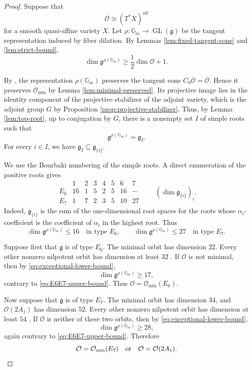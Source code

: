 \documentclass[10pt,a4paper]{amsart}
\newcommand{\Gm}{\mathbb G_m}
\newcommand{\aff}{\mathrm{aff}}
\begin{document}
\begin{proof}
Suppose that
\[
\overline{\mathcal O}\cong(T^*X)^{\aff}
\]
for a smooth quasi-affine variety $X$. Let
$\rho:\Gm\to\operatorname{GL}(\mathfrak g)$ be the tangent
representation induced by fiber dilation. By Lemmas
\ref{lem:fixed-tangent-cone} and \ref{lem:strict-bound},
\begin{equation}\label{eq:exceptional-lower-bound}
\dim\mathfrak g^{\rho(\Gm)}
\geq\frac12\dim\mathcal O+1.
\end{equation}

By \cite[Lemma 5.2]{Jia}, the representation $\rho(\Gm)$ preserves the
tangent cone $C_0\overline{\mathcal O}=\overline{\mathcal O}$. Hence it
preserves $\overline{\mathcal O}_{\min}$ by Lemma
\ref{lem:minimal-preserved}. Its projective image lies in the identity
component of the projective stabilizer of the adjoint variety, which
is the adjoint group $G$ by Proposition
\ref{prop:projective-stabilizer}.
Thus, by Lemma \ref{lem:top-root}, up to conjugation by $G$, there
is a nonempty set $I$ of simple roots such that
\[
\mathfrak g^{\rho(\Gm)}=\mathfrak g_I.
\]
For every $i\in I$, we have
$\mathfrak g_I\subseteq\mathfrak g_{\{i\}}$.

We use the Bourbaki numbering of the simple roots. A direct enumeration
of the positive roots gives
\[
\begin{array}{c|rrrrrrr}
 &1&2&3&4&5&6&7\\
\hline
E_6&16&1&5&2&5&16&-\\
E_7&1&7&2&3&5&10&27
\end{array}
\qquad
\left(\dim\mathfrak g_{\{i\}}\right)_{i}.
\]
Indeed, $\mathfrak g_{\{i\}}$ is the sum of the one-dimensional root
spaces for the roots whose $\alpha_i$-coefficient is the coefficient
of $\alpha_i$ in the highest root. Thus
\begin{equation}\label{eq:E6E7-upper-bound}
\dim\mathfrak g^{\rho(\Gm)}\leq16
\quad\text{in type }E_6,
\qquad
\dim\mathfrak g^{\rho(\Gm)}\leq27
\quad\text{in type }E_7.
\end{equation}

Suppose first that $\mathfrak g$ is of type $E_6$. The minimal orbit
has dimension $22$. Every other nonzero nilpotent orbit has dimension
at least $32$ \cite[Section 8.4]{CM}. If $\mathcal O$ is not minimal,
then by \eqref{eq:exceptional-lower-bound},
\[
\dim\mathfrak g^{\rho(\Gm)}\geq17,
\]
contrary to \eqref{eq:E6E7-upper-bound}. Thus
$\mathcal O=\mathcal O_{\min}(E_6)$.

Now suppose that $\mathfrak g$ is of type $E_7$. The minimal orbit has
dimension $34$, and $\mathcal O(2A_1)$ has dimension $52$. Every other
nonzero nilpotent orbit has dimension at least $54$
\cite[Section 8.4]{CM}. If $\mathcal O$ is neither of these two
orbits, then by \eqref{eq:exceptional-lower-bound},
\[
\dim\mathfrak g^{\rho(\Gm)}\geq28,
\]
again contrary to \eqref{eq:E6E7-upper-bound}. Therefore
\[
\mathcal O=\mathcal O_{\min}(E_7)
\quad\text{or}\quad
\mathcal O=\mathcal O(2A_1).
\qedhere
\]
\end{proof}
\end{document}
